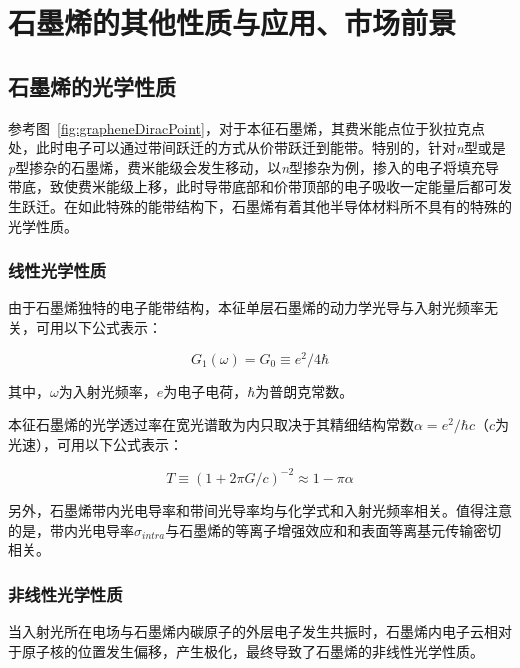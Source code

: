 
\chapter{石墨烯的其他性质与应用、市场前景}

\section{石墨烯的光学性质}

参考图~\ref{fig:grapheneDiracPoint}，对于本征石墨烯，其费米能点位于狄拉克点处，此时电子可以通过带间跃迁的方式从价带跃迁到能带。特别的，针对\textit{n}型或是\textit{p}型掺杂的石墨烯，费米能级会发生移动，以\textit{n}型掺杂为例，掺入的电子将填充导带底，致使费米能级上移，此时导带底部和价带顶部的电子吸收一定能量后都可发生跃迁。在如此特殊的能带结构下，石墨烯有着其他半导体材料所不具有的特殊的光学性质。

\subsection{线性光学性质}

由于石墨烯独特的电子能带结构，本征单层石墨烯的动力学光导与入射光频率无关，可用以下公式表示：

\begin{equation}
    G_1(\omega) = G_0 \equiv e^2/4\hbar
\end{equation}

其中，$\omega$为入射光频率，$e$为电子电荷，$\hbar$为普朗克常数。

本征石墨烯的光学透过率在宽光谱敢为内只取决于其精细结构常数$\alpha = e^2/\hbar c$（$c$为光速），可用以下公式表示：

\begin{equation}
    T \equiv (1+2\pi G/c)^{-2} \approx 1-\pi \alpha
\end{equation}

另外，石墨烯带内光电导率和带间光导率均与化学式和入射光频率相关。值得注意的是，带内光电导率$\sigma_{intra}$与石墨烯的等离子增强效应和和表面等离基元传输密切相关。

\subsection{非线性光学性质}

当入射光所在电场与石墨烯内碳原子的外层电子发生共振时，石墨烯内电子云相对于原子核的位置发生偏移，产生极化，最终导致了石墨烯的非线性光学性质。

